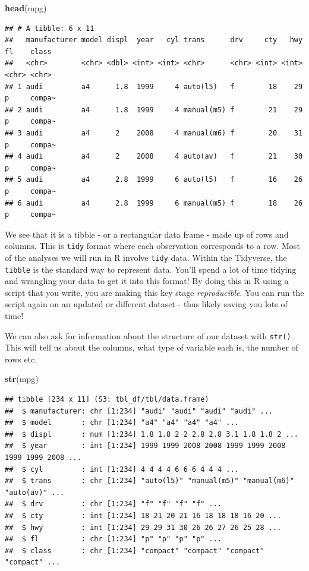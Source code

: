\documentclass[
]{book}
\newenvironment{Shaded}{\begin{snugshade}}{\end{snugshade}}
\newcommand{\FunctionTok}[1]{\textcolor[rgb]{0.13,0.29,0.53}{\textbf{#1}}}
\newcommand{\NormalTok}[1]{#1}
\begin{document}
\begin{Shaded}
\begin{Highlighting}[]
\FunctionTok{head}\NormalTok{(mpg)}
\end{Highlighting}
\end{Shaded}

\begin{verbatim}
## # A tibble: 6 x 11
##   manufacturer model displ  year   cyl trans      drv     cty   hwy fl    class 
##   <chr>        <chr> <dbl> <int> <int> <chr>      <chr> <int> <int> <chr> <chr> 
## 1 audi         a4      1.8  1999     4 auto(l5)   f        18    29 p     compa~
## 2 audi         a4      1.8  1999     4 manual(m5) f        21    29 p     compa~
## 3 audi         a4      2    2008     4 manual(m6) f        20    31 p     compa~
## 4 audi         a4      2    2008     4 auto(av)   f        21    30 p     compa~
## 5 audi         a4      2.8  1999     6 auto(l5)   f        16    26 p     compa~
## 6 audi         a4      2.8  1999     6 manual(m5) f        18    26 p     compa~
\end{verbatim}

We see that it is a tibble - or a rectangular data frame - made up of rows and columns. This is \texttt{tidy} format where each observation corresponds to a row. Most of the analyses we will run in R involve \texttt{tidy} data. Within the Tidyverse, the \texttt{tibble} is the standard way to represent data. You'll spend a lot of time tidying and wrangling your data to get it into this format! By doing this in R using a script that you write, you are making this key stage \emph{reproducible}. You can run the script again on an updated or different dataset - thus likely saving you lots of time!

We can also ask for information about the structure of our dataset with \texttt{str()}. This will tell us about the columns, what type of variable each is, the number of rows etc.

\begin{Shaded}
\begin{Highlighting}[]
\FunctionTok{str}\NormalTok{(mpg)}
\end{Highlighting}
\end{Shaded}

\begin{verbatim}
## tibble [234 x 11] (S3: tbl_df/tbl/data.frame)
##  $ manufacturer: chr [1:234] "audi" "audi" "audi" "audi" ...
##  $ model       : chr [1:234] "a4" "a4" "a4" "a4" ...
##  $ displ       : num [1:234] 1.8 1.8 2 2 2.8 2.8 3.1 1.8 1.8 2 ...
##  $ year        : int [1:234] 1999 1999 2008 2008 1999 1999 2008 1999 1999 2008 ...
##  $ cyl         : int [1:234] 4 4 4 4 6 6 6 4 4 4 ...
##  $ trans       : chr [1:234] "auto(l5)" "manual(m5)" "manual(m6)" "auto(av)" ...
##  $ drv         : chr [1:234] "f" "f" "f" "f" ...
##  $ cty         : int [1:234] 18 21 20 21 16 18 18 18 16 20 ...
##  $ hwy         : int [1:234] 29 29 31 30 26 26 27 26 25 28 ...
##  $ fl          : chr [1:234] "p" "p" "p" "p" ...
##  $ class       : chr [1:234] "compact" "compact" "compact" "compact" ...
\end{verbatim}
\end{document}
